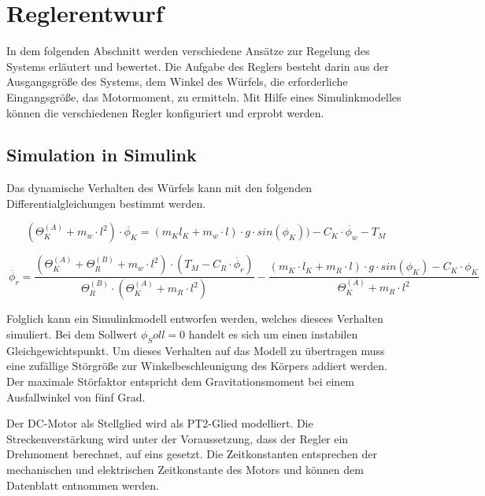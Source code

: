 \documentclass{article}
\begin{document}
\section*{Reglerentwurf}
In dem folgenden Abschnitt werden verschiedene Ansätze zur Regelung des Systems erläutert und bewertet. Die Aufgabe des Reglers besteht darin aus der Ausgangsgröße des Systems, dem Winkel des Würfels, die erforderliche Eingangsgröße, das Motormoment, zu ermitteln. Mit Hilfe eines Simulinkmodelles können die verschiedenen Regler konfiguriert und erprobt werden. 

\subsection*{Simulation in Simulink}
Das dynamische Verhalten des Würfels kann mit den folgenden Differentialgleichungen bestimmt werden.

\[\ (\Theta_K^{(A)} + m_w \cdot l^2) \cdot \ddot{\phi_K} = (m_K  l_K + m_w \cdot l) \cdot g \cdot sin(\phi_K)) - C_K \cdot \dot{\phi_w} - T_M  \]

\[\ \ddot{\phi_r} = \frac{(\Theta_K^{(A)}+\Theta_R^{(B)} + m_w \cdot l^2 ) \cdot (T_M - C_R \cdot \dot{\phi_r}) }{\Theta_R^{(B)} \cdot (\Theta_K^{(A)} + m_R \cdot l^2)} 
- \frac{(m_K \cdot l_K + m_R \cdot l) \cdot g \cdot sin(\phi_K) - C_K \cdot \phi_K}
{\Theta_K^{(A)} + m_R \cdot l^2} \]

Folglich kann ein Simulinkmodell entworfen werden, welches diesees Verhalten simuliert. Bei dem Sollwert $\phi_Soll = 0$ handelt es sich um einen instabilen Gleichgewichtspunkt. Um dieses Verhalten auf das Modell zu übertragen muss eine zufällige Störgröße zur Winkelbeschleunigung des Körpers addiert werden. Der maximale Störfaktor entspricht dem Gravitationsmoment bei einem Ausfallwinkel von fünf Grad.

Der DC-Motor als Stellglied wird als PT2-Glied modelliert. Die Streckenverstärkung wird unter der Voraussetzung, dass der Regler ein Drehmoment berechnet, auf eins gesetzt. Die Zeitkonstanten entsprechen der mechanischen und elektrischen Zeitkonstante des Motors und können dem Datenblatt entnommen werden.
\end{document}
